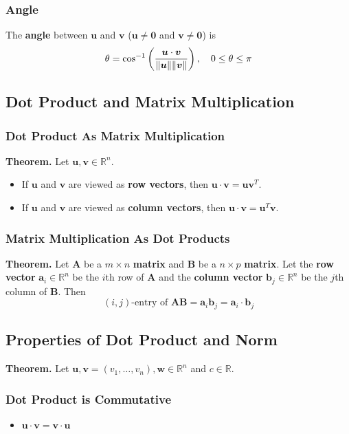 \documentclass[../ma2001_notes.tex]{subfiles}
\begin{document}
\subsubsection{Angle}
The \textbf{angle} between \(\bm{u}\) and \(\bm{v}\) (\(\bm{u}\ne\bm{0}\) and \(\bm{v}\ne\bm{0}\)) is
\[\theta=\cos^{-1}\left(\frac{\bm{u}\cdot\bm{v}}{\lVert\bm{u}\rVert\lVert\bm{v}\rVert}\right),\quad0\leq\theta\leq\pi\]

\subsection{Dot Product and Matrix Multiplication}
\subsubsection{Dot Product As Matrix Multiplication}
\textbf{Theorem.} Let \(\bm{u},\bm{v}\in\mathbb{R}^n\).
\begin{itemize}
	\item If \(\bm{u}\) and \(\bm{v}\) are viewed as \textbf{row vectors}, then \(\bm{u}\cdot\bm{v}=\bm{u}\bm{v}^T\).
	\item If \(\bm{u}\) and \(\bm{v}\) are viewed as \textbf{column vectors}, then \(\bm{u}\cdot\bm{v}=\bm{u}^T\bm{v}\).
\end{itemize}

\subsubsection{Matrix Multiplication As Dot Products}
\textbf{Theorem.} Let \(\bm{A}\) be a \(m\times n\) \textbf{matrix} and \(\bm{B}\) be a \(n\times p\) \textbf{matrix}. Let the \textbf{row vector} \(\bm{a}_i\in\mathbb{R}^n\) be the \(i\)th row of \(\bm{A}\) and the \textbf{column vector} \(\bm{b}_j\in\mathbb{R}^n\) be the \(j\)th column of \(\bm{B}\). Then
\[(i,j)\text{-entry of }\bm{AB}=\bm{a}_i\bm{b}_j=\bm{a}_i\cdot\bm{b}_j\]

\subsection{Properties of Dot Product and Norm}
\textbf{Theorem.} Let \(\bm{u},\bm{v}=(v_1,\ldots,v_n),\bm{w}\in\mathbb{R}^n\) and \(c\in\mathbb{R}\).

\subsubsection{Dot Product is Commutative}
\begin{itemize}
	\item\(\bm{u}\cdot\bm{v}=\bm{v}\cdot\bm{u}\)
\end{itemize}
\end{document}
